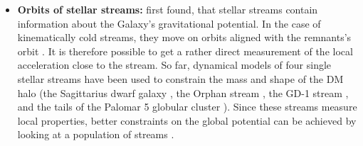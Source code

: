 \begin{itemize}
    \iffalse\item Kinematics of nearby stars: \cite{Kuijken...LocalDMdens...1989, Bovy...LocalDMdens...2012} \fi
    \item \textbf{Orbits of stellar streams:} \citet{Johnston...MWstreams...1999} first found, that stellar streams contain information about the Galaxy's gravitational potential. In the case of kinematically cold streams, they move on orbits aligned with the remnants's orbit \citep{Eyre...streamstheo...2011}. It is therefore possible to get a rather direct measurement of the local acceleration close to the stream. So far, dynamical models of four single stellar streams have been used to constrain the mass and shape of the \ac{DM} halo (the Sagittarius dwarf galaxy \citep{Law...sagstream...2010, Gibbons...sagstream...2014, Dierickx...sagstream..2017}, the Orphan stream \citep{Newberg...orphanstream..2010}, the GD-1 stream \citep{Koposov...GD1stream...2010, Bowden...GD1stream...2015, Malhan...GD1stream...2018}, and the tails of the Palomar 5 globular cluster \citep{Kupper...pal5stream...2015}). Since these streams measure local properties, better constraints on the global potential can be achieved by looking at a population of streams \citep{Bonaca...streamsinfo...2018}.
    

\end{itemize}
